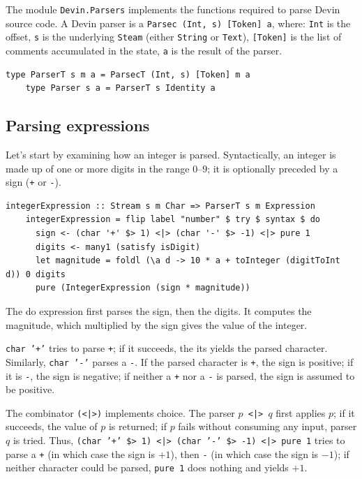 \documentclass[UdineBachThesis,american,11pt]{PhdThesis}
\begin{document}
  \pagebreak

  The module \mbox{\texttt{Devin.Parsers}} implements the functions required to
  parse Devin source code. A Devin parser is a
  \mbox{\texttt{Parsec (Int, s) [Token] a}}, where: \mbox{\texttt{Int}} is the
  offset, \texttt{s} is the underlying \mbox{\texttt{Steam}} (either
  \mbox{\texttt{String}} or \mbox{\texttt{Text}}), \mbox{\texttt{[Token]}} is
  the list of comments accumulated in the state, \texttt{a} is the result of the
  parser.

  \begin{Verbatim}[gobble=4,fontsize=\small]
    type ParserT s m a = ParsecT (Int, s) [Token] m a
    type Parser s a = ParserT s Identity a
  \end{Verbatim}

  \subsection{Parsing expressions}

  Let's start by examining how an integer is parsed. Syntactically, an integer
  is made up of one or more digits in the range \mbox{$0$--$9$}; it is
  optionally preceded by a sign (\texttt{+} or \texttt{-}).

  \begin{Verbatim}[gobble=4,fontsize=\small]
    integerExpression :: Stream s m Char => ParserT s m Expression
    integerExpression = flip label "number" $ try $ syntax $ do
      sign <- (char '+' $> 1) <|> (char '-' $> -1) <|> pure 1
      digits <- many1 (satisfy isDigit)
      let magnitude = foldl (\a d -> 10 * a + toInteger (digitToInt d)) 0 digits
      pure (IntegerExpression (sign * magnitude))
  \end{Verbatim}

  The do expression first parses the sign, then the digits. It computes the
  magnitude, which multiplied by the sign gives the value of the integer.

  \mbox{\texttt{char '+'}} tries to parse \texttt{+}; if it succeeds, the its
  yields the parsed character. Similarly, \mbox{\texttt{char '-'}} parses a
  \texttt{-}. If the parsed character is \texttt{+}, the sign is positive; if it
  is \texttt{-}, the sign is negative; if neither a \texttt{+} nor a \texttt{-}
  is parsed, the sign is assumed to be positive.

  The combinator \mbox{\texttt{(<|>)}} implements choice. The parser
  \mbox{\texttt{$p$ <|> $q$}} first applies $p$; if it succeeds, the value of
  $p$ is returned; if $p$ fails without consuming any input, parser $q$ is
  tried. Thus, \mbox{\texttt{(char '+' \$> 1) <|> (char '-' \$> -1) <|> pure 1}}
  tries to parse a \texttt{+} (in which case the sign is \mbox{$+1$}), then
  \texttt{-} (in which case the sign is \mbox{$-1$}); if neither character could
  be parsed, \mbox{\texttt{pure 1}} does nothing and yields \mbox{$+1$}.
\end{document}
